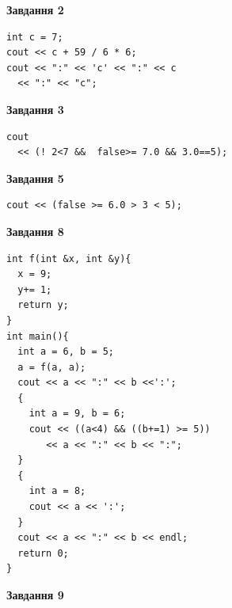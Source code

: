 \documentclass[12pt, ukrainian]{article}
\begin{document}
{\begin {large}
\begin{minipage}[t]{7.0cm}
\end{minipage}
\vline \hspace{1mm}
\begin{minipage}[t]{11.0cm}

\begin{center}
\textbf{Завдання 2}
\end{center}
\vspace{-8mm}

\begin{verbatim}
int c = 7;
cout << c + 59 / 6 * 6;
cout << ":" << 'c' << ":" << c 
  << ":" << "c";
\end{verbatim}



\begin{center}
\textbf{Завдання 3}
\end{center}
\vspace{-8mm}

\begin{verbatim}
cout 
  << (! 2<7 &&  false>= 7.0 && 3.0==5);
\end{verbatim}



\begin{center}
\textbf{Завдання 5}
\end{center}
\vspace{-8mm}

\begin{verbatim}
cout << (false >= 6.0 > 3 < 5);
\end{verbatim}



\begin{center}
\textbf{Завдання 8}
\end{center}
\vspace{-8mm}

\begin{verbatim}
int f(int &x, int &y){
  x = 9;
  y+= 1;
  return y;
}
int main(){
  int a = 6, b = 5;
  a = f(a, a);
  cout << a << ":" << b <<':';
  {
    int a = 9, b = 6;
    cout << ((a<4) && ((b+=1) >= 5))
       << a << ":" << b << ":";
  }
  {
    int a = 8;
    cout << a << ':';
  }
  cout << a << ":" << b << endl;
  return 0;
}
\end{verbatim}

\end{minipage}


\begin{minipage}[t]{7.0cm}

\begin{center}
\textbf{Завдання 9}
\end{center}
\vspace{-8mm}


\end{minipage}
\end{large}}
\end{document}
